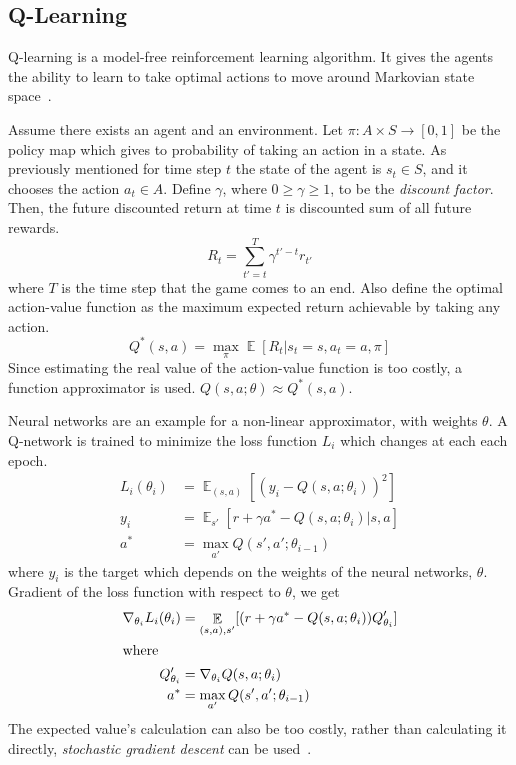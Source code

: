\documentclass[a4paper, 12pt, conference]{IEEEtran}
\DeclareMathOperator{\Ex}{\mathbb{E}}
\begin{document}
\subsection{Q-Learning}
Q-learning is a model-free reinforcement learning algorithm. It gives the agents the ability to learn to take optimal actions to move around Markovian state space~\autocite{watkins1992q}.

Assume there exists an agent and an environment. Let \(\pi: A \times S \to [0,1]\) be the policy map which gives to probability of taking an action in a state. As previously mentioned for time step \(t\) the state of the agent is \(s_t\in S\), and it chooses the action \(a_t\in A\). Define \(\gamma \), where \(0\geq \gamma \geq 1\), to be the \emph{discount factor}. Then, the future discounted return at time \(t\) is discounted sum of all future rewards.
\begin{equation}
    R_t=\sum ^T _{t'=t} \gamma^{t'-t}r_{t'}
\end{equation}
where \(T\) is the time step that the game comes to an end. Also define the optimal action-value function as the maximum expected return achievable by taking any action.
\begin{equation}
    Q^*(s,a)=\max_{\pi} \Ex [R_t|s_t =s, a_t =a, \pi]
\end{equation}
Since estimating the real value of the action-value function is too costly, a function approximator is used. \(Q(s,a;\theta) \approx Q^*(s,a)\).

Neural networks are an example for a non-linear approximator, with weights \(\theta \). A Q-network is trained to minimize the loss function \(L_i\) which changes at each each epoch.
\begin{align}
    L_i(\theta_i) & = \Ex_{(s,a)}[{(y_i-Q(s,a;\theta_i))}^2]        \\
    y_i           & = \Ex_{s'}[r+\gamma a^{*} -Q(s,a;\theta_i)|s,a] \\
    a^{*}         & = \max_{a'}Q(s',a';\theta_{i-1})
\end{align}
where \(y_i\) is the target which depends on the weights of the neural networks, \(\theta \). Gradient of the loss function with respect to \(\theta \), we get
\begin{align}
    \nabla_{\theta_i}L_i(\theta_i) & =\Ex_{(s,a),s'}[(r+\gamma a^{*} - Q(s,a;\theta_i))Q_{\theta_i}^\prime] \\
    \shortintertext{where}
    Q_{\theta_i}^\prime            & = \nabla_{\theta_i} Q(s,a;\theta_i)                                    \\
    a^{*}                          & = \max_{a'}Q(s',a';\theta_{i-1})
\end{align}
The expected value's calculation can also be too costly, rather than calculating it directly, \emph{stochastic gradient descent} can be used~\autocite{mnih2013playing}.
\end{document}
